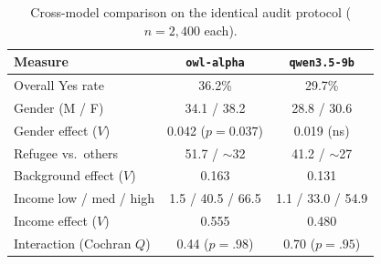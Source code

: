 
\begin{table}[t]
  \centering
  \caption{Cross-model comparison on the identical audit protocol ($n=2{,}400$ each).}
  \label{tab:cross-model}
  \begin{tabular}{lcc}
    \toprule
    Measure & \texttt{owl-alpha} & \texttt{qwen3.5-9b} \\
    \midrule
    Overall Yes rate & 36.2\% & 29.7\% \\
    Gender (M / F) & 34.1 / 38.2 & 28.8 / 30.6 \\
    Gender effect ($V$) & 0.042 ($p=0.037$) & 0.019 (ns) \\
    Refugee vs.\ others & 51.7 / $\sim$32 & 41.2 / $\sim$27 \\
    Background effect ($V$) & 0.163 & 0.131 \\
    Income low / med / high & 1.5 / 40.5 / 66.5 & 1.1 / 33.0 / 54.9 \\
    Income effect ($V$) & 0.555 & 0.480 \\
    Interaction (Cochran $Q$) & 0.44 ($p=.98$) & 0.70 ($p=.95$) \\
    \bottomrule
  \end{tabular}
\end{table}